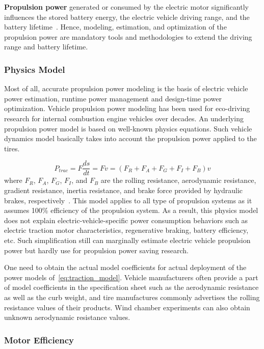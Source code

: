\textbf{Propulsion power} generated or consumed by the electric motor significantly influences the stored battery energy, the electric vehicle driving range, and the battery lifetime~\cite{AF_8,AF_9,AF_10}. Hence, modeling, estimation, and optimization of the propulsion power are mandatory tools and methodologies to extend the driving range and battery lifetime.

\subsubsection{Physics Model} \label{subsubsec:physical_model}

Most of all, accurate propulsion power modeling is the basis of electric vehicle power estimation, runtime power management and design-time power optimization. Vehicle propulsion power modeling has been used for eco-driving research for internal combustion engine vehicles over decades. An underlying propulsion power model is based on well-known physics equations. Such vehicle dynamics model basically takes into account the propulsion power applied to the tires.

\begin{equation} \label{eq:traction_model}
P_{trac} = F \frac{ds}{dt} = Fv= (F_{R} + F_{A} + F_{G} + F_{I} + F_{B}) v
\end{equation}
%
where $F_R$, $F_A$, $F_G$, $F_I$, and $F_B$ are the rolling resistance, aerodynamic resistance, gradient resistance, inertia resistance, and brake force provided by hydraulic brakes, respectively~\cite{Chang:ICCAD14, Park:DAC13}. This model applies to all type of propulsion systems as it assumes 100\% efficiency of the propulsion system. As a result, this physics model does not explain electric-vehicle-specific power consumption behaviors such as electric traction motor characteristics, regenerative braking, battery efficiency, etc. Such simplification still can marginally estimate electric vehicle propulsion power but hardly use for propulsion power saving research.

One need to obtain the actual model coefficients for actual deployment of the power models of~\eqref{eq:traction_model}. Vehicle manufacturers often provide a part of model coefficients in the specification sheet such as the aerodynamic resistance as well as the curb weight, and tire manufactures commonly advertises the rolling resistance values of their products. Wind chamber experiments can also obtain unknown aerodynamic resistance values.

\subsubsection{Motor Efficiency} \label{subsubsec:motor_eff}

